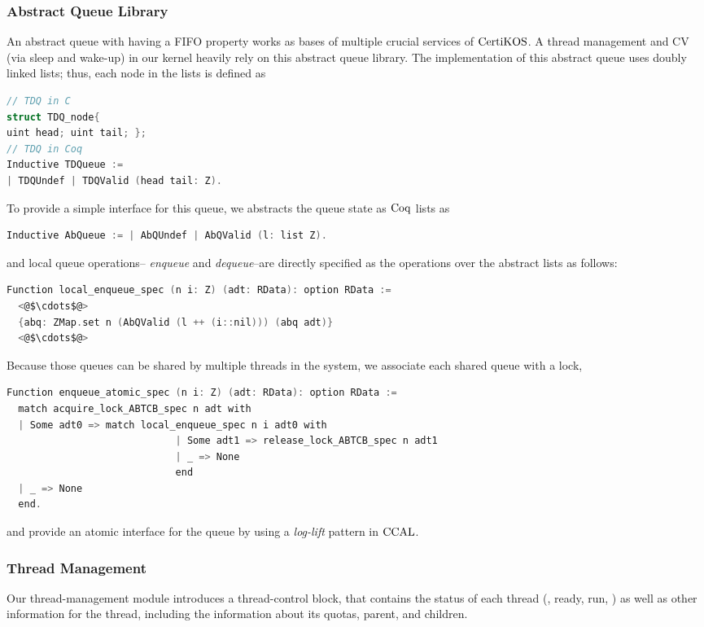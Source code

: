 \subsubsection{Abstract Queue Library}

An abstract queue with having a FIFO property works as bases of multiple crucial services of $\mathrm{CertiKOS}$. 
A thread management and  CV (via sleep and wake-up) in our kernel heavily rely on this abstract queue library. 
The implementation of this abstract queue uses 
doubly linked lists; thus, each node in the lists is defined as 
\begin{lstlisting}[language = C, multicols=2]
// TDQ in C
struct TDQ_node{
uint head; uint tail; };
// TDQ in Coq
Inductive TDQueue :=
| TDQUndef | TDQValid (head tail: Z).   
\end{lstlisting}
To provide a  simple interface for this queue, 
we abstracts the queue state as $\mathrm{Coq}$ lists as
\begin{lstlisting}[language = C]
Inductive AbQueue := | AbQUndef | AbQValid (l: list Z).
\end{lstlisting}
and local queue operations--
 \textit{enqueue} and \textit{dequeue}--are directly specified as the operations over the abstract lists as follows:
\begin{lstlisting}[language = C]
Function local_enqueue_spec (n i: Z) (adt: RData): option RData :=
  <@$\cdots$@>
  {abq: ZMap.set n (AbQValid (l ++ (i::nil))) (abq adt)}
  <@$\cdots$@>
\end{lstlisting}
Because those queues can be shared by multiple threads in the system, 
we associate each shared queue with a lock,
\begin{lstlisting}[language = C]
Function enqueue_atomic_spec (n i: Z) (adt: RData): option RData :=
  match acquire_lock_ABTCB_spec n adt with
  | Some adt0 => match local_enqueue_spec n i adt0 with
                             | Some adt1 => release_lock_ABTCB_spec n adt1
                             | _ => None
                             end
  | _ => None
  end.
\end{lstlisting}
and provide an atomic interface for the queue by using a \textit{log-lift} pattern in $\mathrm{CCAL}$.


\subsubsection{Thread Management}
Our thread-management module introduces a  thread-control block, 
that contains the status of each thread (\ie, ready, run, \etc)
as well as other information for the thread, including the information about its quotas, parent, and children.

